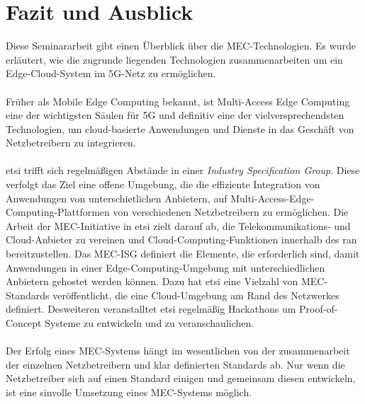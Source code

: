 \documentclass[runningheads]{llncs}
\numberwithin{figure}{section}
\begin{document}
\newpage

\section{Fazit und Ausblick}
Diese Seminararbeit gibt einen Überblick über die MEC-Technologien. Es wurde erläutert, wie die 
zugrunde liegenden
Technologien zusammenarbeiten um ein Edge-Cloud-System im 5G-Netz zu ermöglichen.
\\
\\
Früher als Mobile Edge Computing bekannt, ist Multi-Access Edge Computing eine der 
wichtigsten Säulen für 5G und definitiv eine der vielversprechendsten Technologien, 
um cloud-basierte Anwendungen und Dienste in das Geschäft von Netzbetreibern zu integrieren.
\\
\\
\acrlong{etsi} trifft sich regelmäßigen Abstände in einer \textit{Industry Specification Group}.
Diese verfolgt das Ziel eine
offene Umgebung, die die effiziente Integration von Anwendungen von unterschietlichen Anbietern,
auf Multi-Access-Edge-Computing-Plattformen von verschiedenen Netzbetreibern zu ermöglichen.
Die Arbeit der MEC-Initiative in \acrshort{etsi} zielt darauf ab, 
die Telekommunikations- und Cloud-Anbieter zu vereinen 
und Cloud-Computing-Funktionen innerhalb des \acrfull{ran} bereitzustellen. 
Das MEC-ISG definiert die Elemente, die erforderlich sind, 
damit Anwendungen in einer Edge-Computing-Umgebung mit unterschiedlichen Anbietern gehostet werden können.
Dazu hat \acrlong{etsi} eine Vielzahl von MEC-Standards veröffentlicht, die eine Cloud-Umgebung am Rand des 
Netzwerkes definiert. Desweiteren veranstalltet \acrlong{etsi} regelmäßig Hackathons um Proof-of-Concept Systeme
zu entwickeln und zu veranschaulichen.
\\
\\
Der Erfolg eines MEC-Systems hängt im wesentlichen von der zusammenarbeit der einzelnen Netzbetreibern 
und klar definierten Standards ab. Nur wenn die Netzbetreiber sich auf einen Standard einigen und gemeinsam diesen
entwickeln, ist eine sinvolle Umsetzung eines MEC-Systems möglich.



\newpage
%
\printbibliography[heading=bibintoc]
\end{document}
